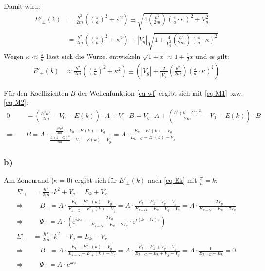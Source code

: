 Damit wird:
\begin{align}
\nonumber
  E'_\pm(k) &=\frac{\hbar^2}{2 m}\left(\left(\frac{\pi}{a}\right)^2 + \kappa^2\right)
  \pm \sqrt{4 \left(\frac{\hbar^2}{2 m}\right) \left(\frac{\pi}{a}\cdot \kappa \right)^2 + V_g^2}\\
\label{eq-Ek}
  & = \frac{\hbar^2}{2 m}\left(\left(\frac{\pi}{a}\right)^2 + \kappa^2\right)
  \pm |V_g|\sqrt{1 + \frac{4}{V_g^2}\left(\frac{\hbar^2}{2 m}\right) \left(\frac{\pi}{a}\cdot \kappa \right)^2 }
\end{align}
Wegen $\kappa \ll \frac{\pi}{a}$ lässt sich die Wurzel entwickeln
$\sqrt{1 + x} \approx 1 + \frac{1}{2}x$ und es gilt:
\begin{align}
  E'_\pm(k) &\approx \frac{\hbar^2}{2 m}\left(\left(\frac{\pi}{a}\right)^2 + \kappa^2\right)
  \pm  \left(|V_g| + \frac{2}{|V_g|}\left(\frac{\hbar^2}{2 m}\right) \left(\frac{\pi}{a}\cdot \kappa \right)^2 \right)
\end{align}

Für den Koeffizienten $B$ der Wellenfunktion \eqref{eq-wf} ergibt sich mit \eqref{eq-M1} bzw. \eqref{eq-M2}:
\begin{align}
\nonumber
0 &= \left(\frac{\hbar^2k^2}{2m}-V_0-E(k)\right)\cdot  A + V_g \cdot B =
V_g \cdot A + \left(\frac{\hbar^2(k-G)^2}{2m}-V_0-E(k)\right) \cdot B \\
\Rightarrow \quad & B = A \cdot \frac{\frac{\hbar^2k^2}{2m}-V_0-E(k)-V_g}
   {\frac{\hbar^2(k-G)^2}{2m}-V_0-E(k)-V_g}
= A \cdot \frac{E_k - E'(k)-V_g}{E_{k-G} - E'(k)-V_g}
\end{align}

\subsubsection*{b)}
Am Zonenrand ($\kappa = 0$) ergibt sich für $E'_\pm(k)$ nach \eqref{eq-Ek}
mit $\frac{\pi}{a} = k$:
\begin{align*}
  E'_+ &= \frac{\hbar^2}{2 m} \cdot k^2 + V_g  = E_k + V_g \\
\Rightarrow & \quad  B_+ = A \cdot \frac{E_k - E'_+(k) - V_g}{E_{k-G}  - E'_+(k) - V_g} =
  A \cdot \frac{E_k - E_k - V_g - V_g}{E_{k-G}  - E_k - V_g - V_g} =
  A \cdot \frac{- 2 V_g}{E_{k-G} - E_k - 2 V_g} \\
\Rightarrow & \quad  \Psi_+ = A \cdot \left(\mathrm e^{i k z}
  - \frac{2 V_g}{E_{k-G} - E_k - 2 V_g} \cdot \mathrm e^{i (k-G) z}  \right) \\
  E'_- &= \frac{\hbar^2}{2 m} \cdot k^2 - V_g = E_k - V_g \\
\Rightarrow & \quad  B_- = A \cdot \frac{E_k - E'_-(k) - V_g}{E_{k-G}  - E'_+(k) - V_g} =
  A \cdot \frac{E_k - E_k + V_g - V_g}{E_{k-G}  - E_k + V_g - V_g} =
  A \cdot \frac{0}{E_{k-G}  - E_k} = 0 \\
\Rightarrow & \quad  \Psi_- = A \cdot \mathrm e^{i k z}
\end{align*}

